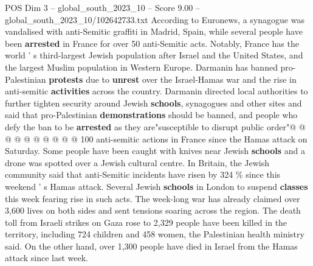 \begin{textsample}{POS Dim 3 – global\_south\_2023\_10 – Score 9.00 – global\_south\_2023\_10/102642733.txt}
According to Euronews, a synagogue was vandalised with anti-Semitic graffiti in Madrid, Spain, while several people have been \textbf{arrested} in France for over 50 anti-Semitic acts.
Notably, France has the world ' s third-largest Jewish population after Israel and the United States, and the largest Muslim population in Western Europe.
Darmanin has banned pro-Palestinian \textbf{protests} due to \textbf{unrest} over the Israel-Hamas war and the rise in anti-semitic \textbf{activities} across the country.
Darmanin directed local authorities to further tighten security around Jewish \textbf{schools}, synagogues and other sites and said that pro-Palestinian \textbf{demonstrations} should be banned, and people who defy the ban to be \textbf{arrested} as they are"susceptible to disrupt public order"@ @ @ @ @ @ @ @ @ @ 100 anti-semitic actions in France since the Hamas attack on Saturday.
Some people have been caught with knives near Jewish \textbf{schools} and a drone was spotted over a Jewish cultural centre.
In Britain, the Jewish community said that anti-Semitic incidents have risen by 324 \% since this weekend ' s Hamas attack.
Several Jewish \textbf{schools} in London to suspend \textbf{classes} this week fearing rise in such acts.
The week-long war has already claimed over 3,600 lives on both sides and sent tensions soaring across the region.
The death toll from Israeli strikes on Gaza rose to 2,329 people have been killed in the territory, including 724 children and 458 women, the Palestinian health ministry said.
On the other hand, over 1,300 people have died in Israel from the Hamas attack since last week.

\end{textsample}
